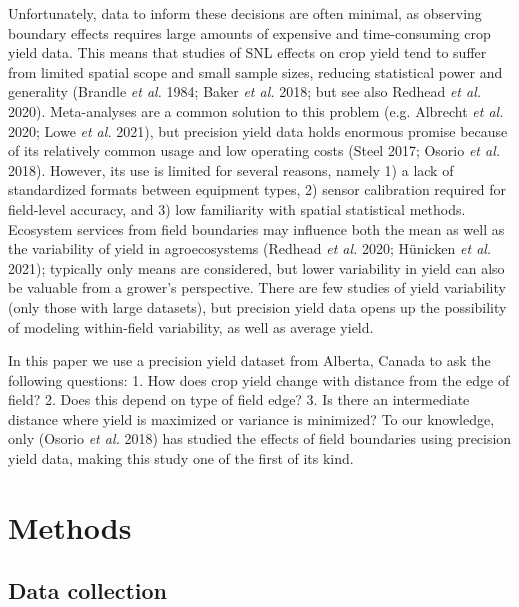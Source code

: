 \documentclass[]{elsarticle} %
\begin{document}
Unfortunately, data to inform these decisions are often minimal, as observing boundary effects requires large amounts of expensive and time-consuming crop yield data.
This means that studies of SNL effects on crop yield tend to suffer from limited spatial scope and small sample sizes, reducing statistical power and generality (Brandle \emph{et al.} 1984; Baker \emph{et al.} 2018; but see also Redhead \emph{et al.} 2020).
Meta-analyses are a common solution to this problem (e.g. Albrecht \emph{et al.} 2020; Lowe \emph{et al.} 2021), but precision yield data holds enormous promise because of its relatively common usage and low operating costs (Steel 2017; Osorio \emph{et al.} 2018).
However, its use is limited for several reasons, namely 1) a lack of standardized formats between equipment types, 2) sensor calibration required for field-level accuracy, and 3) low familiarity with spatial statistical methods.
Ecosystem services from field boundaries may influence both the mean as well as the variability of yield in agroecosystems (Redhead \emph{et al.} 2020; Hünicken \emph{et al.} 2021); typically only means are considered, but lower variability in yield can also be valuable from a grower's perspective.
There are few studies of yield variability (only those with large datasets), but precision yield data opens up the possibility of modeling within-field variability, as well as average yield.

In this paper we use a precision yield dataset from Alberta, Canada to ask the following questions:
1. How does crop yield change with distance from the edge of field?
2. Does this depend on type of field edge?
3. Is there an intermediate distance where yield is maximized or variance is minimized?
To our knowledge, only (Osorio \emph{et al.} 2018) has studied the effects of field boundaries using precision yield data, making this study one of the first of its kind.

\hypertarget{methods}{%
\section{Methods}\label{methods}}

\hypertarget{data-collection}{%
\subsection{Data collection}\label{data-collection}}
\end{document}
